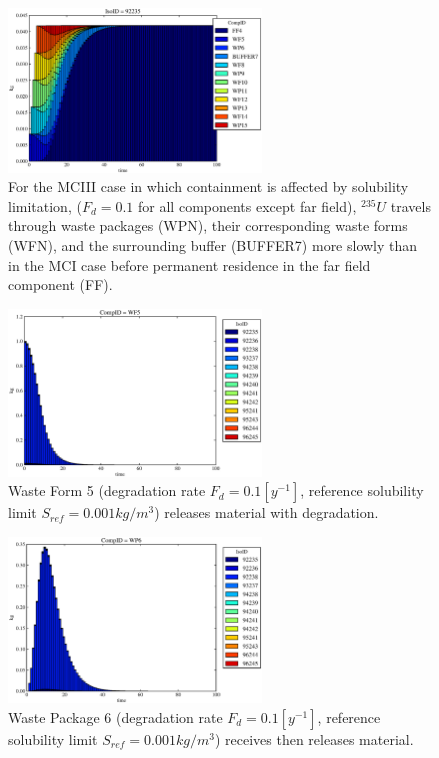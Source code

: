 
\begin{figure}[ht]
\centering
\includegraphics[width=0.6\textwidth]{./results/images/mcIII.eps}
\caption[$^{235}U$ residence. Mixed Cell Coupled Sorption and Solubility Limitation.]{
For the MCIII case in which containment is affected by solubility limitation,
        ($F_{d}=0.1$ for all components except far field), $^{235}U$ travels through waste 
        packages (WPN), their corresponding waste forms (WFN), and the surrounding 
        buffer (BUFFER7) more slowly than in the MCI case
        before permanent residence in the far field component (FF).
}
\label{fig:mcIIIall}
\end{figure}

\begin{figure}[ht]
\centering
  \includegraphics[width=0.6\textwidth]{./results/images/mcIII1.eps}
  \caption[Case MCIII Waste Form Contaminants.]{
          Waste Form 5 (degradation rate $F_d = 0.1[y^{-1}]$, reference solubility limit $S_{ref} = 0.001kg/m^3$) releases material with degradation.
    }
  \label{fig:mcIIIwf5}
\end{figure}


\begin{figure}[ht]
\centering
  \includegraphics[width=0.6\textwidth]{./results/images/mcIII2.eps}
  \caption[Case MCIII Waste Package Contaminants.]{
          Waste Package 6 (degradation rate $F_d = 0.1[y^{-1}]$, reference solubility limit $S_{ref}=0.001kg/m^3$) receives then releases material.
    }
  \label{fig:mcIIIwp6}
\end{figure}

